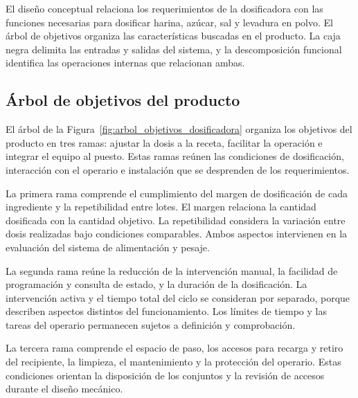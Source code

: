 El diseño conceptual relaciona los requerimientos de la dosificadora
con las funciones necesarias para dosificar harina, azúcar, sal y
levadura en polvo. El árbol de objetivos organiza las características
buscadas en el producto. La caja negra delimita las entradas y salidas
del sistema, y la descomposición funcional identifica las operaciones
internas que relacionan ambas.

\subsection{Árbol de objetivos del producto}

El árbol de la Figura~\ref{fig:arbol_objetivos_dosificadora} organiza los
objetivos del producto en tres ramas: ajustar la dosis a la receta,
facilitar la operación e integrar el equipo al puesto. Estas ramas
reúnen las condiciones de dosificación, interacción con el operario e
instalación que se desprenden de los requerimientos.

La primera rama comprende el cumplimiento del margen de dosificación
de cada ingrediente y la repetibilidad entre lotes. El margen relaciona
la cantidad dosificada con la cantidad objetivo. La repetibilidad
considera la variación entre dosis realizadas bajo condiciones
comparables. Ambos aspectos intervienen en la evaluación del sistema
de alimentación y pesaje.

La segunda rama reúne la reducción de la intervención manual, la
facilidad de programación y consulta de estado, y la duración de la
dosificación. La intervención activa y el tiempo total del ciclo se
consideran por separado, porque describen aspectos distintos del
funcionamiento. Los límites de tiempo y las tareas del operario
permanecen sujetos a definición y comprobación.

La tercera rama comprende el espacio de paso, los accesos para recarga
y retiro del recipiente, la limpieza, el mantenimiento y la protección
del operario. Estas condiciones orientan la disposición de los
conjuntos y la revisión de accesos durante el diseño mecánico.

